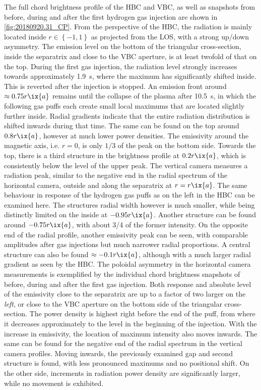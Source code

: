             The full chord brightness profile of the HBC and VBC, as well as snapshots from before, during and after the first hydrogen gas injection are shown in \cref{fig:20180920.31_CP}. From the perspective of the HBC, the radiation is mainly located inside $r\in\left\{-1, 1\right\}$ as projected from the LOS, with a strong up/down asymmetry. The emission level on the bottom of the triangular cross-section, inside the separatrix and close to the VBC aperture, is at least twofold of that on the top. During the first gas injection, the radiation level strongly increases towards approximately \SI{1.9}{\second}, where the maximum has significantly shifted inside. This is reverted after the injection is stopped. An emission front around $\approx 0.75r\ix{a}$ remains until the collapse of the plasma after \SI{10.5}{\second}, in which the following gas puffs each create small local maximums that are located slightly further inside. Radial gradients indicate that the entire radiation distribution is shifted inwards during that time. The same can be found on the top around $0.8r\ix{a}$, however at much lower power densities. The emissivity around the magnetic axis, i.e. $r=0$, is only $1/3$ of the peak on the bottom side. Towards the top, there is a third structure in the brightness profile at $0.2r\ix{a}$, which is consistently below the level of the upper peak. The vertical camera measures a radiation peak, similar to the negative end in the radial spectrum of the horizontal camera, outside and along the separatrix at $r=r\ix{a}$. The same behaviour in response of the hydrogen gas puffs as on the left in the HBC can be examined here. The structures radial width however is much smaller, while being distinctly limited on the inside at $-0.95r\ix{a}$. Another structure can be found around $-0.75r\ix{a}$, with about 3/4 of the former intensity. On the opposite end of the radial profile, another emissivity peak can be seen, with comparable amplitudes after gas injections but much narrower radial proportions. A central structure can also be found $\approx-0.1r\ix{a}$, although with a much larger radial gradient as seen by the HBC. The poloidal asymmetry in the horizontal camera measurements is exemplified by the individual chord brightness snapshots of before, during and after the first gas injection. Both response and absolute level of the emissivity close to the separatrix are up to a factor of two larger on the \textit{left}, or close to the VBC aperture on the bottom side of the triangular cross-section. The power density is highest right before the end of the puff, from where it decreases approximately to the level in the beginning of the injection. With the increase in emissivity, the location of maximum intensity also moves inwards. The same can be found for the negative end of the radial spectrum in the vertical camera profiles. Moving inwards, the previously examined gap and second structure is found, with less pronounced maximums and no positional shift. On the other side, increments in radiation power density are significantly larger, while no movement is exhibited.\\%
